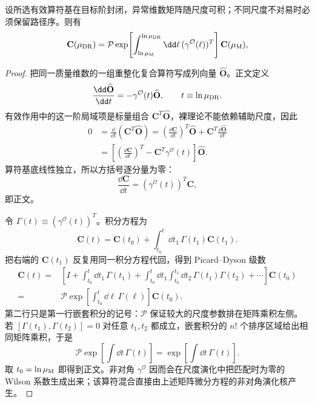 \begin{proposition}
设所选有效算符基在目标阶封闭，异常维数矩阵随尺度可积；不同尺度不对易时必须保留路径序。则有
\begin{equation}
{
\mathbf C(\mu_{\rm DR})
=\mathcal P\exp\!\left[
\int_{\ln\mu_{\rm M}}^{\ln\mu_{\rm DR}}\dd\ell\,
(\gamma^{\mathcal O}(\ell))^T
\right]\mathbf C(\mu_{\rm M}),}
\label{eq:smeft-wilson-evolution-dp90}
\end{equation}
\end{proposition}
\begin{proof}
把同一质量维数的一组重整化复合算符写成列向量 $\widehat{\mathbf O}$。正文定义
\begin{equation*}
\frac{\dd\widehat{\mathbf O}}{\dd t}
=-\gamma^{\mathcal O}(t)\widehat{\mathbf O},
\qquad t\equiv\ln\mu_{\rm DR}.
\end{equation*}
有效作用中的这一阶局域项是标量组合 $\mathbf C^T\widehat{\mathbf O}$，裸理论不能依赖辅助尺度，因此
\begin{align*}
0
&=\frac{\dd}{\dd t}(\mathbf C^T\widehat{\mathbf O})
=\left(\frac{\dd\mathbf C}{\dd t}\right)^T\widehat{\mathbf O}
+\mathbf C^T\frac{\dd\widehat{\mathbf O}}{\dd t}\\
&=\left[
\left(\frac{\dd\mathbf C}{\dd t}\right)^T
-\mathbf C^T\gamma^{\mathcal O}(t)
\right]\widehat{\mathbf O}.
\end{align*}
算符基底线性独立，所以方括号逐分量为零：
\begin{equation*}
\frac{\dd\mathbf C}{\dd t}
=(\gamma^{\mathcal O}(t))^T\mathbf C,
\end{equation*}
即正文。

令 $\Gamma(t)\equiv(\gamma^{\mathcal O}(t))^T$。积分方程为
\begin{equation*}
\mathbf C(t)=\mathbf C(t_0)+\int_{t_0}^{t}\dd t_1\,\Gamma(t_1)\mathbf C(t_1).
\end{equation*}
把右端的 $\mathbf C(t_1)$ 反复用同一积分方程代回，得到 Picard--Dyson 级数
\begin{align*}
\mathbf C(t)
={}&\left[I+\int_{t_0}^{t}\dd t_1\,\Gamma(t_1)
+\int_{t_0}^{t}\dd t_1\int_{t_0}^{t_1}\dd t_2\,
\Gamma(t_1)\Gamma(t_2)+\cdots\right]\mathbf C(t_0)\\
={}&\mathcal P\exp\!\left[
\int_{t_0}^{t}\dd\ell\,\Gamma(\ell)
\right]\mathbf C(t_0).
\end{align*}
第二行只是第一行嵌套积分的记号：$\mathcal P$ 保证较大的尺度参数排在矩阵乘积左侧。若 $[\Gamma(t_1),\Gamma(t_2)]=0$ 对任意 $t_1,t_2$ 都成立，嵌套积分的 $n!$ 个排序区域给出相同矩阵乘积，于是
\begin{equation*}
\mathcal P\exp\!\left[\int\dd t\,\Gamma(t)\right]
=\exp\!\left[\int\dd t\,\Gamma(t)\right].
\end{equation*}
取 $t_0=\ln\mu_{\rm M}$ 即得到正文。非对角 $\gamma^{\mathcal O}$ 因而会在尺度演化中把匹配时为零的 Wilson 系数生成出来；该算符混合直接由上述矩阵微分方程的非对角演化核产生。
\end{proof}

